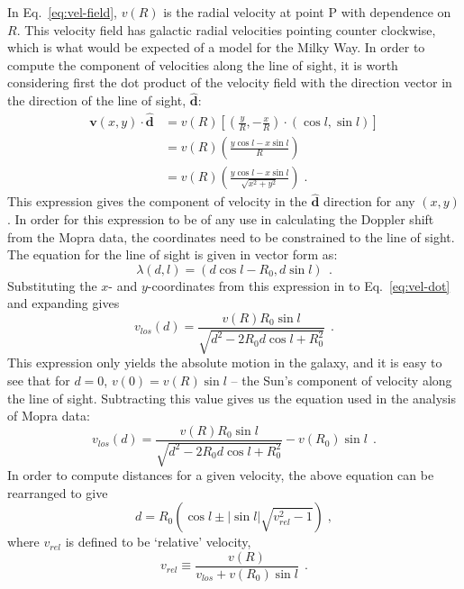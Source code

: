 \documentclass[a4paper, titlepage, oneside]{article}
\begin{document}
In Eq.~\eqref{eq:vel-field}, \(v(R)\) is the radial velocity at point P with dependence on \(R\). This velocity field has galactic radial velocities pointing counter clockwise, which is what would be expected of a model for the Milky Way. In order to compute the component of velocities along the line of sight, it is worth considering first the dot product of the velocity field with the direction vector in the direction of the line of sight, \(\mathbf{\hat{d}}\):
\begin{align}
  \mathbf{v}(x,y)\cdot\mathbf{\hat{d}}&=v(R)\left[\left(\frac{y}{R},-\frac{x}{R}\right)\!\cdot(\cos{l},\sin{l})\right] \\
  &=v(R)\left(\frac{y\cos{l}-x\sin{l}}{R}\right) \\
  &=v(R)\left(\frac{y\cos{l}-x\sin{l}}{\sqrt{x^2+y^2}}\right)\;.
  \label{eq:vel-dot}
\end{align}
This expression gives the component of velocity in the \(\mathbf{\hat{d}}\) direction for any \((x,y)\). In order for this expression to be of any use in calculating the Doppler shift from the Mopra data, the coordinates need to be constrained to the line of sight. The equation for the line of sight is given in vector form as:
\begin{equation}
  \lambda(d,l)=(d\cos{l}-R_0,d\sin{l})\;\,.
\end{equation}
Substituting the \(x\)- and \(y\)-coordinates from this expression in to Eq.~\eqref{eq:vel-dot} and expanding gives
\begin{equation}
  v_{los}(d)=\frac{v(R)R_0\sin{l}}{\sqrt{d^2-2R_0d\cos{l}+R_0^2}}\;\,.
\end{equation}
This expression only yields the absolute motion in the galaxy, and it is easy to see that for \(d=0\), \(v(0)=v(R)\sin{l}\) -- the Sun's component of velocity along the line of sight. Subtracting this value gives us the equation used in the analysis of Mopra data:
\begin{equation}
  v_{los}(d)=\frac{v(R)R_0\sin{l}}{\sqrt{d^2-2R_0d\cos{l}+R_0^2}}-v(R_0)\sin{l}\;\,.
\end{equation}
In order to compute distances for a given velocity, the above equation can be rearranged to give
\begin{equation}
  d=R_0\left(\cos{l}\pm|\sin{l}|\sqrt{v_{rel}^2-1}\right)\;,
  \label{eq:d}
\end{equation}
where \(v_{rel}\) is defined to be `relative' velocity,
\begin{equation}
  v_{rel}\equiv\frac{v(R)}{v_{los}+v(R_0)\sin{l}}\;\,.
\end{equation}
\end{document}
